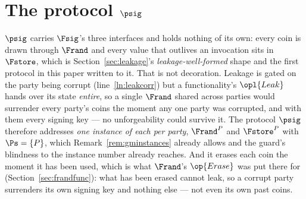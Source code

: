\documentclass[10pt,oneside,openany]{book}
\theoremstyle{accentdef}
\theoremstyle{accentplain}
\begin{document}
\section{The protocol \texorpdfstring{$\psig$}{π\_Sig}}\label{sec:psig}

$\psig$ carries $\Fsig$'s three interfaces and holds nothing of its own: every coin is drawn
through $\Frand$ and every value that outlives an invocation sits in $\Fstore$, which is
Section~\ref{sec:leakage}'s \emph{leakage-well-formed} shape and the first protocol in this paper
written to it. That is not decoration. Leakage is gated on the party being corrupt
(line~\ref{ln:leakcorr}) but a functionality's $\opl{Leak}$ hands over its state \emph{entire}, so
a single $\Frand$ shared across parties would surrender every party's coins the moment any one
party was corrupted, and with them every signing key --- no unforgeability could survive it.
The protocol $\psig$ therefore addresses \emph{one instance of each per party}, $\Frand^{P}$ and $\Fstore^{P}$
with $\Ps = \{P\}$, which Remark~\ref{rem:gminstances} already allows and the guard's blindness to
the instance number already reaches. And it erases each coin the moment it has been used, which is
what $\Frand$'s $\op{Erase}$ was put there for (Section~\ref{sec:frandfunc}): what has been
erased cannot leak, so a corrupt party surrenders its own signing key and nothing else --- not
even its own past coins.
\end{document}
